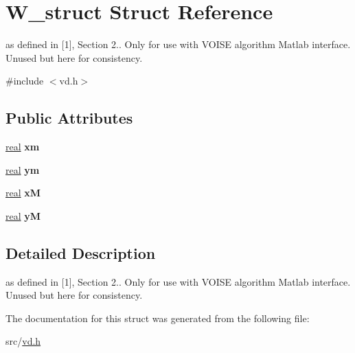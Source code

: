 \hypertarget{structW__struct}{}\section{W\+\_\+struct Struct Reference}
\label{structW__struct}


as defined in \mbox{[}1\mbox{]}, Section 2.. Only for use with V\+O\+I\+SE algorithm Matlab interface. Unused but here for consistency.  




{\ttfamily \#include $<$vd.\+h$>$}

\subsection*{Public Attributes}
\begin{DoxyCompactItemize}
\item 
\mbox{\label{structW__struct_a7c0ed763a5701a0787361a68cad4aec4}} 
\mbox{\hyperlink{typedefs_8h_a58a0c7cf2501f4492da833421be92547}{real}} {\bfseries xm}
\item 
\mbox{\label{structW__struct_a69290893bf3fc1a9bf0ff987a9e25320}} 
\mbox{\hyperlink{typedefs_8h_a58a0c7cf2501f4492da833421be92547}{real}} {\bfseries ym}
\item 
\mbox{\label{structW__struct_a20e12df215aaa6a737a15b05e6102093}} 
\mbox{\hyperlink{typedefs_8h_a58a0c7cf2501f4492da833421be92547}{real}} {\bfseries xM}
\item 
\mbox{\label{structW__struct_a10de004bf31c6563ad0a55116a96cd8d}} 
\mbox{\hyperlink{typedefs_8h_a58a0c7cf2501f4492da833421be92547}{real}} {\bfseries yM}
\end{DoxyCompactItemize}


\subsection{Detailed Description}
as defined in \mbox{[}1\mbox{]}, Section 2.. Only for use with V\+O\+I\+SE algorithm Matlab interface. Unused but here for consistency. 

The documentation for this struct was generated from the following file\+:\begin{DoxyCompactItemize}
\item 
src/\mbox{\hyperlink{vd_8h}{vd.\+h}}\end{DoxyCompactItemize}
